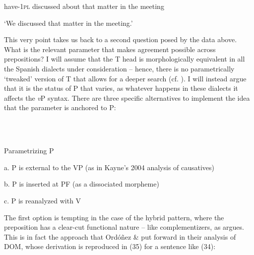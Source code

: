\documentclass[output=paper]{langsci/langscibook}
\begin{document}
\begin{styleHTMLPreformatted}
        have{}-\textsc{1pl}  discussed  about  that  matter  in  the meeting
\end{styleHTMLPreformatted}

\begin{styleHTMLPreformatted}
        ‘We discussed that matter in the meeting.’
\end{styleHTMLPreformatted}

\begin{styleHTMLPreformatted}
This very point takes us back to a second question posed by the data above. What is the relevant parameter that makes agreement possible across prepositions? I will assume that the T head is morphologically equivalent in all the Spanish dialects under consideration – hence, there is no parametrically ‘tweaked’ version of T that allows for a deeper search (cf. \citealt{Chomsky2001}). I will instead argue that it is the status of P that varies, as whatever happens in these dialects it affects the \textit{v}P syntax. There are three specific alternatives to implement the idea that the parameter is anchored to P:
\end{styleHTMLPreformatted}

\begin{styleHTMLPreformatted}
\ea%
    \label{ex:key:33}
    \gll\\
        \\
    \glt
    \z

          Parametrizing P
\end{styleHTMLPreformatted}

\begin{styleHTMLPreformatted}
  a.   P is external to the VP (as in Kayne’s 2004 analysis of causatives)
\end{styleHTMLPreformatted}

\begin{styleHTMLPreformatted}
  b.   P is inserted at PF (as a dissociated morpheme)
\end{styleHTMLPreformatted}

\begin{styleHTMLPreformatted}
  c.   P is reanalyzed with V
\end{styleHTMLPreformatted}

\begin{styleHTMLPreformatted}
The first option is tempting in the case of the hybrid pattern, where the preposition has a clear-cut functional nature – like complementizers, as \citet{Kayne2004} argues. This is in fact the approach that Ordóñez \& \citet{Roca2017} put forward in their analysis of DOM, whose derivation is reproduced in (35) for a sentence like (34):
\end{styleHTMLPreformatted}
\end{document}
